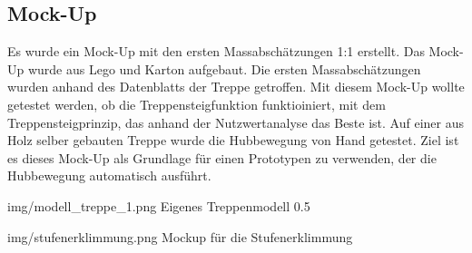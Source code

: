 



\subsection{Mock-Up}
 
 Es wurde ein Mock-Up mit den ersten Massabschätzungen 1:1 erstellt. Das Mock-Up wurde aus Lego und Karton aufgebaut. Die ersten Massabschätzungen wurden anhand des Datenblatts der Treppe getroffen. Mit diesem Mock-Up wollte getestet werden, ob die Treppensteigfunktion funktioiniert, mit dem Treppensteigprinzip, das anhand der Nutzwertanalyse das Beste ist. Auf einer aus Holz selber gebauten Treppe wurde die Hubbewegung von Hand getestet.
 Ziel ist es dieses Mock-Up als Grundlage für einen Prototypen zu verwenden, der die Hubbewegung automatisch ausführt.
 
 \imagewidth
   {img/modell_treppe_1.png}
   {Eigenes Treppenmodell}
   {0.5\textwidth}

 \image
   {img/stufenerklimmung.png}
   {Mockup für die Stufenerklimmung}
